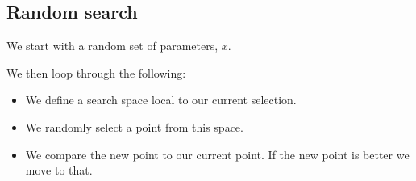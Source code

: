 
\subsection{Random search}

We start with a random set of parameters, \(x\).

We then loop through the following:

\begin{itemize}
\item We define a search space local to our current selection.
\item We randomly select a point from this space.
\item We compare the new point to our current point. If the new point is better we move to that.
\end{itemize}

